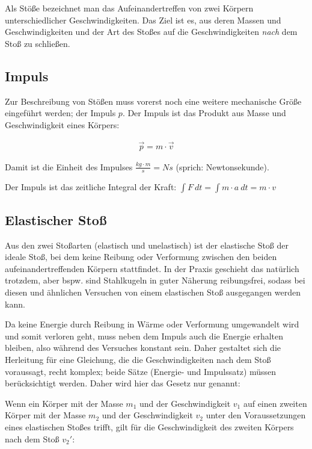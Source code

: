 Als Stöße bezeichnet man das Aufeinandertreffen von zwei Körpern unterschiedlicher Geschwindigkeiten. Das Ziel ist es, aus deren Massen und Geschwindigkeiten und der Art des Stoßes auf die Geschwindigkeiten \emph{nach} dem Stoß zu schließen.

\subsection{Impuls} \label{subsec:impuls}

Zur Beschreibung von Stößen muss vorerst noch eine weitere mechanische Größe eingeführt werden; der Impuls $p$. Der Impuls ist das Produkt aus Masse und Geschwindigkeit eines Körpers:

\begin{align}
	\vec{p} = m \cdot \vec{v}
\end{align}

\noindent Damit ist die Einheit des Impulses $\frac{kg \cdot m}{s} = Ns$ (sprich: \glqq Newtonsekunde\grqq).

\begin{NiceToKnow}
Der Impuls ist das zeitliche Integral der Kraft: $\int F \ dt = \int m \cdot a \ dt = m \cdot v$
\end{NiceToKnow}


\subsection{Elastischer Stoß}

Aus den zwei Stoßarten (elastisch und unelastisch) ist der elastische Stoß der ideale Stoß, bei dem keine Reibung oder Verformung zwischen den beiden aufeinandertreffenden Körpern stattfindet. In der Praxis geschieht das natürlich trotzdem, aber bspw. sind Stahlkugeln in guter Näherung reibungsfrei, sodass bei diesen und ähnlichen Versuchen von einem elastischen Stoß ausgegangen werden kann.

Da keine Energie durch Reibung in Wärme oder Verformung umgewandelt wird und somit \glqq verloren geht\grqq , muss neben dem Impuls auch die Energie erhalten bleiben, also während des Versuches konstant sein. Daher gestaltet sich die Herleitung für eine Gleichung, die die Geschwindigkeiten nach dem Stoß voraussagt, recht komplex; beide Sätze (Energie- und Impulssatz) müssen berücksichtigt werden. Daher wird hier das Gesetz nur genannt:

Wenn ein Körper mit der Masse $m_1$ und der Geschwindigkeit $v_1$ auf einen zweiten Körper mit der Masse $m_2$ und der Geschwindigkeit $v_2$ unter den Voraussetzungen eines elastischen Stoßes trifft, gilt für die Geschwindigkeit des zweiten Körpers nach dem Stoß $v_2'$:

